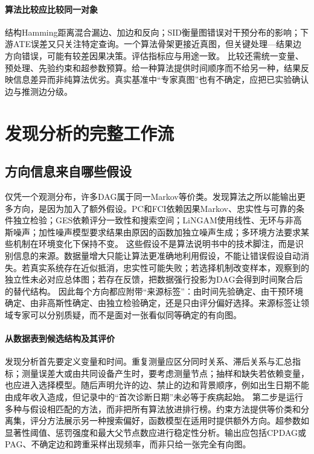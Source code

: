 \paragraph{算法比较应比较同一对象}

结构Hamming距离混合漏边、加边和反向；SID衡量图错误对干预分布的影响；下游ATE误差又只关注特定查询。一个算法骨架更接近真图，但关键处理---结果边方向错误，可能有较差因果决策。评估指标应与用途一致。
比较还需统一变量、预处理、先验约束和超参数预算。给一种算法提供时间顺序而不给另一种，结果反映信息差异而非纯算法优劣。真实基准中“专家真图”也有不确定，应把已实验确认边与推测边分级。

\section{发现分析的完整工作流}

\subsection{方向信息来自哪些假设}

仅凭一个观测分布，许多DAG属于同一Markov等价类。发现算法之所以能输出更多方向，是因为加入了额外假设。PC和FCI依赖因果Markov、忠实性与可靠的条件独立检验；GES依赖评分一致性和搜索空间；LiNGAM使用线性、无环与非高斯噪声；加性噪声模型要求结果由原因的函数加独立噪声生成；多环境方法要求某些机制在环境变化下保持不变。
这些假设不是算法说明书中的技术脚注，而是识别信息的来源。数据量增大只能让算法更准确地利用假设，不能让错误假设自动消失。若真实系统存在近似抵消，忠实性可能失败；若选择机制改变样本，观察到的独立性未必对应总体图；若存在反馈，把数据强行投影为DAG会得到时间聚合后的替代结构。
因此每个方向都应附带“来源标签”：由时间先验确定、由干预环境确定、由非高斯性确定、由独立检验确定，还是只由评分偏好选择。来源标签让领域专家可以分别质疑，而不是面对一张看似同等确定的有向图。

\paragraph{从数据表到候选结构及其评价}

发现分析首先要定义变量和时间。重复测量应区分同时关系、滞后关系与汇总指标；测量误差大或由共同设备产生时，要考虑测量节点；抽样和缺失若依赖变量，也应进入选择模型。随后声明允许的边、禁止的边和背景顺序，例如出生日期不能由成年收入造成，但记录中的“首次诊断日期”未必等于疾病起始。
第二步是运行多种与假设相匹配的方法，而非把所有算法放进排行榜。约束方法提供等价类和分离集，评分方法展示另一种搜索偏好，函数模型在适用时提供额外方向。超参数如显著性阈值、惩罚强度和最大父节点数应进行稳定性分析。输出应包括CPDAG或PAG、不确定边和跨重采样出现频率，而非只给一张完全有向图。


